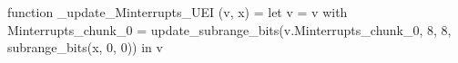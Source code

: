 function _update_Minterrupts_UEI (v, x) = let v = { v with Minterrupts_chunk_0 = update_subrange_bits(v.Minterrupts_chunk_0, 8, 8, subrange_bits(x, 0, 0)) } in
  v
